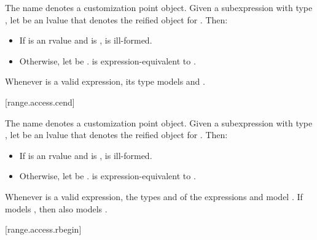 \pnum
The name  denotes a customization point
object.
Given a subexpression  with type ,
let  be an lvalue that denotes the reified object for .
Then:
\begin{itemize}
\item
If  is an rvalue and
 is ,
 is ill-formed.
\item
Otherwise,
let  be .
 is expression-equivalent to
.
\end{itemize}

\pnum
\begin{note}
Whenever  is a valid expression, its type models
 and .
\end{note}

[range.access.cend]{}
%

\pnum
The name  denotes a customization point
object.
Given a subexpression  with type ,
let  be an lvalue that denotes the reified object for .
Then:
\begin{itemize}
\item
If  is an rvalue and
 is ,
 is ill-formed.
\item
Otherwise,
let  be .
 is expression-equivalent to
.
\end{itemize}

\pnum
\begin{note}
Whenever  is a valid expression,
the types  and  of the expressions
 and 
model .
If  models ,
then  also models .
\end{note}

[range.access.rbegin]{}
%

